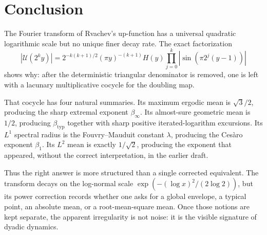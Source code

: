 \documentclass[11pt,oneside]{article}
\theoremstyle{definition}
\theoremstyle{remark}
\newcommand{\Uhat}{\mathcal U}
\begin{document}
\section{Conclusion}

The Fourier transform of Rvachev's up-function has a universal quadratic logarithmic
scale but no unique finer decay rate.  The exact factorization
\[
 |\Uhat(2^ky)|
 =2^{-k(k+1)/2}(\pi y)^{-(k+1)}H(y)
 \prod_{j=0}^{k}|\sin(\pi2^j(y-1))|
\]
shows why: after the deterministic triangular denominator is removed, one is left with a
lacunary multiplicative cocycle for the doubling map.

That cocycle has four natural summaries.  Its maximum ergodic mean is
$\sqrt3/2$, producing the sharp extremal exponent $\beta_\infty$.  Its almost-sure
geometric mean is $1/2$, producing $\beta_{\mathrm{typ}}$ together with sharp positive
iterated-logarithm excursions.  Its $L^1$ spectral radius is the Fouvry--Mauduit constant
$\lambda$, producing the Ces\`aro exponent $\beta_1$.  Its $L^2$ mean is exactly
$1/\sqrt2$, producing the exponent that appeared, without the correct interpretation,
in the earlier draft.

Thus the right answer is more structured than a single corrected equivalent.  The
transform decays on the log-normal scale
$\exp(- (\log x)^2/(2\log2))$, but its power correction records whether one asks for a
global envelope, a typical point, an absolute mean, or a root-mean-square mean.  Once
those notions are kept separate, the apparent irregularity is not noise: it is the
visible signature of dyadic dynamics.
\end{document}
